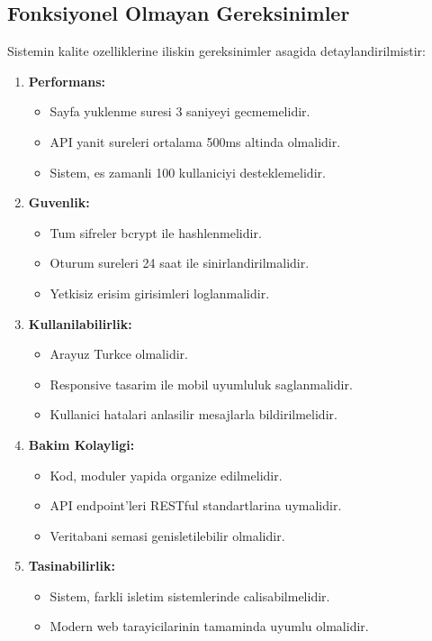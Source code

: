 \subsection{Fonksiyonel Olmayan Gereksinimler}
\label{subsec:fonksiyonel-olmayan-gereksinimler}

Sistemin kalite ozelliklerine iliskin gereksinimler asagida 
detaylandirilmistir:

\begin{enumerate}
    \item \textbf{Performans:}
    \begin{itemize}
        \item Sayfa yuklenme suresi 3 saniyeyi gecmemelidir.
        \item API yanit sureleri ortalama 500ms altinda olmalidir.
        \item Sistem, es zamanli 100 kullaniciyi desteklemelidir.
    \end{itemize}
    
    \item \textbf{Guvenlik:}
    \begin{itemize}
        \item Tum sifreler bcrypt ile hashlenmelidir.
        \item Oturum sureleri 24 saat ile sinirlandirilmalidir.
        \item Yetkisiz erisim girisimleri loglanmalidir.
    \end{itemize}
    
    \item \textbf{Kullanilabilirlik:}
    \begin{itemize}
        \item Arayuz Turkce olmalidir.
        \item Responsive tasarim ile mobil uyumluluk saglanmalidir.
        \item Kullanici hatalari anlasilir mesajlarla bildirilmelidir.
    \end{itemize}
    
    \item \textbf{Bakim Kolayligi:}
    \begin{itemize}
        \item Kod, moduler yapida organize edilmelidir.
        \item API endpoint'leri RESTful standartlarina uymalidir.
        \item Veritabani semasi genisletilebilir olmalidir.
    \end{itemize}
    
    \item \textbf{Tasinabilirlik:}
    \begin{itemize}
        \item Sistem, farkli isletim sistemlerinde calisabilmelidir.
        \item Modern web tarayicilarinin tamaminda uyumlu olmalidir.
    \end{itemize}
\end{enumerate}

